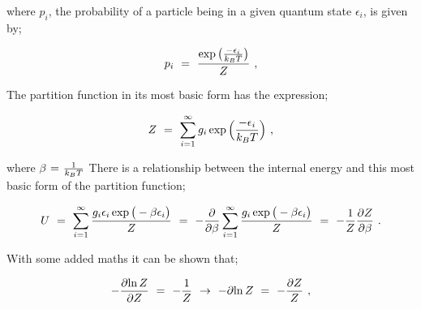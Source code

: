 \documentclass{article}
\begin{document}
where \begin{math} p_i \end{math}, the probability of a particle being in a given quantum state \begin{math} \epsilon_{i} \end{math}, is given by;

\begin{equation} \label{eq:1}
p_i \hspace{0.125cm} = \hspace{0.125cm} \frac{\exp \big(\frac{- \epsilon_i}{k_B T}\big)}{Z}  \hspace{0.125cm} ,
\end{equation}

The partition function in its most basic form has the expression;

\begin{equation} \label{eq:1}
Z \hspace{0.125cm} = \hspace{0.125cm} \sum_{i = 1}^{\infty} g_i \exp \Big(\frac{- \epsilon_i}{k_B T}\Big) \hspace{0.125cm} ,
\end{equation}

where \begin{math} \beta \hspace{0.025cm} = \hspace{0.025cm} \frac{1}{k_B T} \end{math} There is a relationship between the internal energy and this most basic form of the partition function;

\begin{equation} \label{eq:1}
U \hspace{0.125cm} = \hspace{0.125cm} \sum_{i = 1}^{\infty} \frac{g_i \epsilon_{i} \exp \big(- \beta \epsilon_i \big)}{Z} \hspace{0.125cm} = \hspace{0.125cm} - \frac{\partial}{\partial{\beta}}\sum_{i = 1}^{\infty} \frac{g_i \exp \big(- \beta \epsilon_i \big)}{Z} \hspace{0.125cm} = \hspace{0.125cm} - \frac{1}{Z} \frac{\partial Z}{\partial{\beta}}   \hspace{0.125cm} .
\end{equation}

With some added maths it can be shown that;

\begin{equation} \label{eq:1}
- \frac{\partial{\ln{Z}}}{\partial{Z}} \hspace{0.125cm} = \hspace{0.125cm} - \frac{1}{Z} \hspace{0.125cm} \rightarrow \hspace{0.125cm} - \partial{\ln{Z}} \hspace{0.125cm} = \hspace{0.125cm} - \frac{\partial{Z}}{Z} \hspace{0.125cm}, 
\end{equation}
\end{document}
